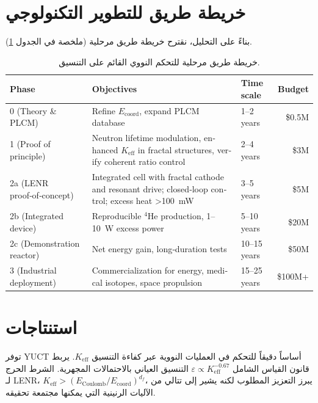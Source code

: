 \documentclass[11pt,a4paper]{article}
\newcommand{\Keff}{K_{\mathrm{eff}}}
\newcommand{\df}{d_{\!f}}
\theoremstyle{remark}
\begin{document}
	\section{خريطة طريق للتطوير التكنولوجي}
	\label{sec:roadmap}
	
	بناءً على التحليل، نقترح خريطة طريق مرحلية (ملخصة في الجدول \ref{tab:roadmap}).
	
	\begin{table}[htbp]
		\begin{otherlanguage}{english}
			\centering
			\caption{Phased roadmap for coordination‑based nuclear control.}
			\label{tab:roadmap}
			\small
			\begin{tabular}{l p{5cm} l r}
				\toprule
				\textbf{Phase} & \textbf{Objectives} & \textbf{Time scale} & \textbf{Budget} \\
				\midrule
				0 (Theory \& PLCM) & Refine \(E_{\mathrm{coord}}\), expand PLCM database & 1–2 years & \$0.5M \\
				1 (Proof of principle) & Neutron lifetime modulation, enhanced \(\Keff\) in fractal structures, verify coherent ratio control & 2–4 years & \$3M \\
				2a (LENR proof‑of‑concept) & Integrated cell with fractal cathode and resonant drive; closed‑loop control; excess heat >100~mW & 3–5 years & \$5M \\
				2b (Integrated device) & Reproducible \(^4\)He production, 1--10~W excess power & 5–10 years & \$20M \\
				2c (Demonstration reactor) & Net energy gain, long‑duration tests & 10–15 years & \$50M \\
				3 (Industrial deployment) & Commercialization for energy, medical isotopes, space propulsion & 15–25 years & \$100M+ \\
				\bottomrule
			\end{tabular}
		\end{otherlanguage}
		\caption{خريطة طريق مرحلية للتحكم النووي القائم على التنسيق.}
	\end{table}
	
	\section{استنتاجات}
	\label{sec:conclusion}
	
	توفر YUCT أساساً دقيقاً للتحكم في العمليات النووية عبر كفاءة التنسيق \(\Keff\). يربط قانون القياس الشامل \(\varepsilon \propto \Keff^{-0.67}\) التنسيق العياني بالاحتمالات المجهرية. الشرط الحرج لـ LENR، \(\Keff > (E_{\text{Coulomb}}/E_{\text{coord}})^{\df}\)، يبرز التعزيز المطلوب لكنه يشير إلى تتالي من الآليات الرنينية التي يمكنها مجتمعة تحقيقه.
	
\end{document}
